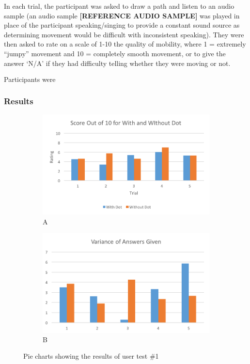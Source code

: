 \documentclass[../../main.tex]{subfiles}
\begin{document}
				In each trial, the participant was asked to draw a path and listen to an audio sample (an audio sample \textbf{[REFERENCE AUDIO SAMPLE]} was played in place of the participant speaking/singing to provide a constant sound source as determining movement would be difficult with inconsistent speaking). They were then asked to rate on a scale of 1-10 the quality of mobility, where 1 = extremely ``jumpy'' movement and 10 = completely smooth movement, or to give the answer `N/A' if they had difficulty telling whether they were moving or not.

				Participants were 

			\subsubsection{Results}

			\begin{figure}[H]
				\begin{subfigure}{1\textwidth}
					\centerline{\includegraphics[scale = 0.7]{Sections/userTesting/images/test3/Q3Score.png}}
					\caption{A}
					\label{score}
				\end{subfigure}
				
				\begin{subfigure}{1\textwidth}
					\centerline{\includegraphics[scale = 0.7]{Sections/userTesting/images/test3/Q3Variance.png}}
					\caption{B}
					\label{variance}
				\end{subfigure}
				\caption{Pie charts showing the results of user test \#1}
				\label{test1Results}
			\end{figure}
\end{document}
